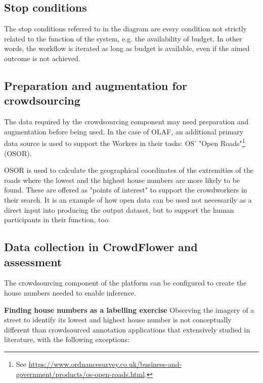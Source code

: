 \subsection{Stop conditions} 

The stop conditions referred to in the diagram are every condition not strictly related to the function of the system, e.g. the availability of budget. In other words, the workflow is iterated as long as budget is available, even if the aimed outcome is not achieved. 

\subsection{Preparation and augmentation for crowdsourcing} 

The data required by the crowdsourcing component may need preparation and augmentation before being used. In the case of OLAF, an additional primary data source is used to support the Workers in their tasks: OS' "Open Roads"\footnote{See \url{https://www.ordnancesurvey.co.uk/business-and-government/products/os-open-roads.html}.} (OSOR). 

OSOR is used to calculate the geographical coordinates of the extremities of the roads where the lowest and the highest house numbers are more likely to be found. These are offered as "points of interest" to support the crowdworkers in their search. It is an example of how open data can be used not necessarily as a direct input into producing the output dataset, but to support the human participants in their function, too.

\subsection{Data collection in CrowdFlower and assessment}

The crowdsourcing component of the platform can be configured to create the house numbers needed to enable inference. 

\textbf{Finding house numbers as a labelling exercise} Observing the imagery of a street to identify its lowest and highest house number is not conceptually different than crowdsourced annotation applications that extensively studied in literature, with the following exceptions:

